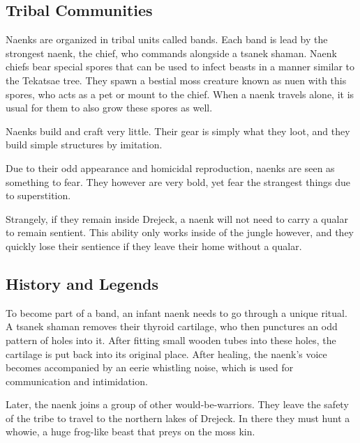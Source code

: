 \subsection*{Tribal Communities}

    Naenks are organized in tribal units called bands.
    Each band is lead by the strongest naenk, the chief, who commands alongside a tsanek shaman.
    Naenk chiefs bear special spores that can be used to infect beasts in a manner similar to the Tekatsae tree.
    They spawn a bestial moss creature known as nuen with this spores, who acts as a pet or mount to the chief.
    When a naenk travels alone, it is usual for them to also grow these spores as well.

    Naenks build and craft very little.
    Their gear is simply what they loot, and they build simple structures by imitation.

    Due to their odd appearance and homicidal reproduction, naenks are seen as something to fear.
    They however are very bold, yet fear the strangest things due to superstition.

    Strangely, if they remain inside Drejeck, a naenk will not need to carry a qualar to remain sentient.
    This ability only works inside of the jungle however, and they quickly lose their sentience if they leave their home without a qualar.

\subsection*{History and Legends}
    To become part of a band, an infant naenk needs to go through a unique ritual.
    A tsanek shaman removes their thyroid cartilage, who then punctures an odd pattern of holes into it.
    After fitting small wooden tubes into these holes, the cartilage is put back into its original place.
    After healing, the naenk's voice becomes accompanied by an eerie whistling noise, which is used for communication and intimidation.

    Later, the naenk joins a group of other would-be-warriors.
    They leave the safety of the tribe to travel to the northern lakes of Drejeck.
    In there they must hunt a whowie, a huge frog-like beast that preys on the moss kin.

